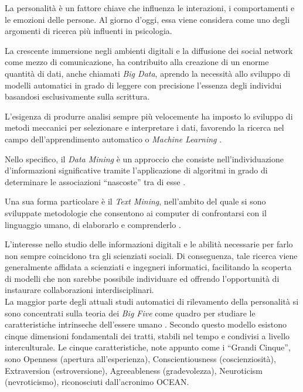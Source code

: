 La personalità è un fattore chiave che influenza le interazioni, i comportamenti e le emozioni delle persone. Al giorno d'oggi, essa viene considera come uno degli argomenti di ricerca più influenti in psicologia.

La crescente immersione negli ambienti digitali e la diffusione dei social network come mezzo di comunicazione, ha contribuito alla creazione di un enorme quantità di dati, anche chiamati \emph{Big Data}, aprendo la necessità allo sviluppo di modelli automatici in grado di leggere con precisione l'essenza degli individui basandosi esclusivamente sulla scrittura.

L'esigenza di produrre analisi sempre più velocemente ha imposto lo sviluppo di metodi meccanici per selezionare e interpretare i dati, favorendo la ricerca nel campo dell'apprendimento automatico o \emph{Machine Learning} \cite{samuel1959some}.

Nello specifico, il \emph{Data Mining} è un approccio che consiste nell'individuazione d’informazioni significative tramite l'applicazione di algoritmi in grado di determinare le associazioni ``nascoste'' tra di esse  \cite{chakrabarti2006data,franklin2005elements}. 

Una sua forma particolare è il \emph{Text Mining}, nell'ambito del quale si sono sviluppate metodologie che consentono ai computer di confrontarsi con il linguaggio umano, di elaborarlo e comprenderlo \cite{tan1999text}.

L'interesse nello studio delle informazioni digitali e le abilità necessarie per farlo non sempre coincidono tra gli scienziati sociali. Di conseguenza, tale ricerca viene generalmente affidata a scienziati e ingegneri informatici, facilitando la scoperta di modelli che non sarebbe possibile individuare ed offrendo l'opportunità di instaurare collaborazioni interdisciplinari.
\\

La maggior parte degli attuali studi automatici di rilevamento della personalità si sono concentrati sulla teoria dei \emph{Big Five} come quadro per studiare le caratteristiche intrinseche dell'essere umano \cite{barrick1991big}.
Secondo questo modello esistono cinque dimensioni fondamentali dei tratti, stabili nel tempo e condivisi a livello interculturale. Le cinque caratteristiche, note appunto come i ``Grandi Cinque'', sono Openness (apertura all'esperienza), Conscientiousness (coscienziosità), Extraversion (estroversione), Agreeableness (gradevolezza), Neuroticism (nevroticismo), riconosciuti dall'acronimo OCEAN.

